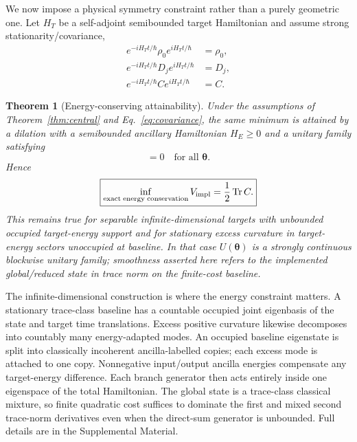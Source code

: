 \documentclass[aps,pra,preprint,nofootinbib]{revtex4-2}
\newtheorem{theorem}{Theorem}
\newcommand{\Tr}{\operatorname{Tr}}
\newcommand{\rhozero}{\rho_0}
\newcommand{\Vimpl}{V_{\rm impl}}
\newcommand{\Cker}{C}
\newcommand{\HT}{H_T}
\begin{document}
We now impose a physical symmetry constraint rather than a purely geometric one. Let $\HT$ be a self-adjoint semibounded target Hamiltonian and assume strong stationarity/covariance,
\begin{align}
 e^{-i\HT t/\hbar}\rhozero e^{i\HT t/\hbar}&=\rhozero,\\
 e^{-i\HT t/\hbar}D_je^{i\HT t/\hbar}&=D_j,\\
 e^{-i\HT t/\hbar}\Cker e^{i\HT t/\hbar}&=\Cker.
 \label{eq:covariance}
\end{align}

\begin{theorem}[Energy-conserving attainability]
\label{thm:energy}
Under the assumptions of Theorem~\ref{thm:central} and Eq.~\eqref{eq:covariance}, the same minimum is attained by a dilation with a semibounded ancillary Hamiltonian $H_E\ge0$ and a unitary family satisfying
\begin{equation}
 [U(\bm\theta),\HT\otimes I+I\otimes H_E]=0
 \quad\text{for all }\bm\theta.
 \label{eq:energyconserve}
\end{equation}
Hence
\begin{equation}
 \boxed{
 \inf_{\rm exact\;energy\;conservation}\Vimpl
 =\frac12\Tr\Cker.
 }
 \label{eq:energyminimum}
\end{equation}
This remains true for separable infinite-dimensional targets with unbounded occupied target-energy support and for stationary excess curvature in target-energy sectors unoccupied at baseline. In that case $U(\bm\theta)$ is a strongly continuous blockwise unitary family; smoothness asserted here refers to the implemented global/reduced state in trace norm on the finite-cost baseline.
\end{theorem}

The infinite-dimensional construction is where the energy constraint matters. A stationary trace-class baseline has a countable occupied joint eigenbasis of the state and target time translations. Excess positive curvature likewise decomposes into countably many energy-adapted modes. An occupied baseline eigenstate is split into classically incoherent ancilla-labelled copies; each excess mode is attached to one copy. Nonnegative input/output ancilla energies compensate any target-energy difference. Each branch generator then acts entirely inside one eigenspace of the total Hamiltonian. The global state is a trace-class classical mixture, so finite quadratic cost suffices to dominate the first and mixed second trace-norm derivatives even when the direct-sum generator is unbounded. Full details are in the Supplemental Material.
\end{document}
